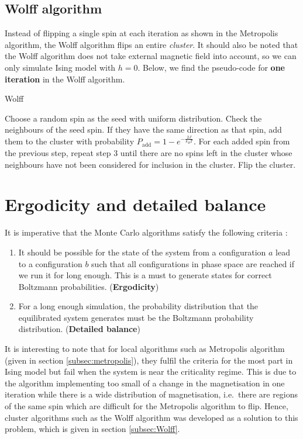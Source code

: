 \documentclass[pra,aps,superscriptaddress,amssymb,amsmath,reprint,noeprint,floatfix]{revtex4-2}
\begin{document}
\subsection{\label{subsec:Wolff}Wolff algorithm}
Instead of flipping a single spin at each iteration as shown in the Metropolis algorithm, the Wolff algorithm flips an entire \textit{cluster}. It should also be noted that the Wolff algorithm does not take external magnetic field into account, so we can only simulate Ising model with $h=0$. Below, we find the pseudo-code for \textbf{one iteration} in the Wolff algorithm.
\begin{algorithm}[H]
    \caption{Wolff}
    \begin{algorithmic}[1]
        \State Choose a random spin as the seed with uniform distribution.
        \State Check the neighbours of the seed spin. 
        \State If they have the same direction as that spin, add them to the cluster with probability $P_\mathrm{add}=1-e^{-\frac{2J}{k_BT}}$.
        \State For each added spin from the previous step, repeat step 3 until there are no spins left in the cluster whose neighbours have not been considered for inclusion in the cluster.
        \State Flip the cluster.
    \end{algorithmic}
    \label{alg:wolff}
\end{algorithm}

\section{\label{sec:ErgodicityandDetailedbalance}Ergodicity and detailed balance}
It is imperative that the Monte Carlo algorithms satisfy the following criteria \cite{newman1999monte}:
\begin{enumerate}
    \itemsep-0.32em
    \item It should be possible for the state of the system from a configuration $a$ lead to a configuration $b$ such that all configurations in phase space are reached if we run it for long enough. This is a must to generate states for correct Boltzmann probabilities. (\textbf{Ergodicity})
    \item For a long enough simulation, the probability distribution that the equilibrated system generates must be the Boltzmann probability distribution. (\textbf{Detailed balance})
\end{enumerate}
It is interesting to note that for local algorithms such as Metropolis algorithm (given in section \ref{subsec:metropolis}), they fulfil the criteria for the most part in Ising model but fail when the system is near the criticality regime. This is due to the algorithm implementing too small of a change in the magnetisation in one iteration while there is a wide distribution of magnetisation, i.e.\ there are regions of the same spin which are difficult for the Metropolis algorithm to flip. Hence, cluster algorithms such as the Wolff algorithm was developed as a solution to this problem, which is given in section \ref{subsec:Wolff}.
\end{document}
